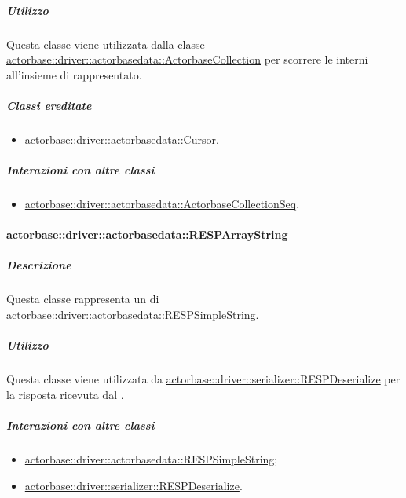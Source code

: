 \documentclass{scalatekids-article}
\begin{document}
\subparagraph{Utilizzo}

Questa classe viene utilizzata dalla classe
\hyperref[sec:actorbase::driver::actorbasedata::ActorbaseCollection]{actorbase::driver::actorbasedata::ActorbaseCollection}
per scorrere le  interni all'insieme di 
rappresentato.

\subparagraph{Classi ereditate}

\begin{itemize}
\item \hyperref[sec:actorbase::driver::actorbasedata::Cursor]{actorbase::driver::actorbasedata::Cursor}.
\end{itemize}

\subparagraph{Interazioni con altre classi}

\begin{itemize}
\item \hyperref[sec:actorbase::driver::actorbasedata::ActorbaseCollectionSeq]{actorbase::driver::actorbasedata::ActorbaseCollectionSeq}.
\end{itemize}

\paragraph{actorbase::driver::actorbasedata::RESPArrayString}
\label{sec:actorbase::driver::actorbasedata::RESPArrayString}

\subparagraph{Descrizione}

Questa classe rappresenta un  di
\hyperref[sec:actorbase::driver::actorbasedata::RESPSimpleString]{actorbase::driver::actorbasedata::RESPSimpleString}.

\subparagraph{Utilizzo}

Questa classe viene utilizzata da \hyperref[sec:actorbase::driver::serializer::RESPDeserialize]{actorbase::driver::serializer::RESPDeserialize}
per  la risposta ricevuta dal .

\subparagraph{Interazioni con altre classi}

\begin{itemize}
\item \hyperref[sec:actorbase::driver::actorbasedata::RESPSimpleString]{actorbase::driver::actorbasedata::RESPSimpleString};
\item \hyperref[sec:actorbase::driver::serializer::RESPDeserialize]{actorbase::driver::serializer::RESPDeserialize}.
\end{itemize}
\end{document}
